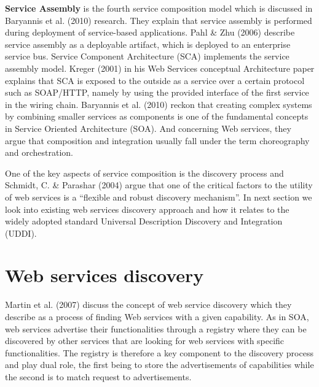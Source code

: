 \documentclass{article}
\begin{document}
\textbf{Service Assembly} is the fourth service composition model which is discussed in Baryannis et al. (2010) research. They explain that service assembly is performed during deployment of service-based applications. Pahl \& Zhu (2006) describe service assembly as a deployable artifact, which is deployed to an enterprise service bus. Service Component Architecture (SCA) implements the service assembly model. Kreger (2001) in his Web Services conceptual Architecture paper explains that SCA is exposed to the outside as a service over a certain protocol such as SOAP/HTTP, namely by using the provided interface of the first service in the wiring chain. Baryannis et al. (2010) reckon that creating complex systems by combining smaller services as components is one of the fundamental concepts in Service Oriented Architecture (SOA). And concerning Web services, they argue that composition and integration usually fall under the term choreography and orchestration.

One of the key aspects of service composition is the discovery process and Schmidt, C. \& Parashar (2004) argue that one of the critical factors to the utility of web services is a “flexible and robust discovery mechanism”. In next section we look into existing web services discovery approach and how it relates to the widely adopted standard Universal Description Discovery and Integration (UDDI).

\section{Web services discovery}

Martin et al. (2007) discuss the concept of web service discovery which they describe as a process of finding Web services with a given capability. As in SOA, web services advertise their functionalities through a registry where they can be discovered by other services that are looking for web services with specific functionalities. The registry is therefore a key component to the discovery process and play dual role, the first being to store the advertisements of capabilities while the second is to match request to advertisements.
\end{document}
